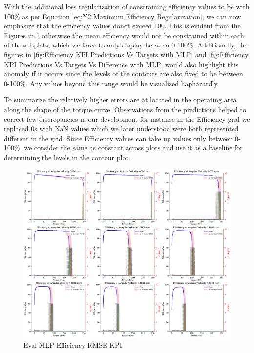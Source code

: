 \documentclass{report} %
\begin{document}
With the additional loss regularization of constraining efficiency values to be with 100\% as per Equation \ref{eq:Y2 Maximum Efficiency Regularization}, we can now emphasize 
that the efficiency values donot exceed 100. This is evident from the Figures in \ref{fig:Eval MLP Efficiency RMSE KPI} otherwise the mean efficiency would not be constrained 
within each of the subplots, which we force to only display between 0-100\%. Additionally, the figures in \ref{fig:Efficiency KPI Predictions Vs Targets with MLP} and 
\ref{fig:Efficiency KPI Predictions Vs Targets Vs Difference with MLP} would also highlight this anomaly if it occurs since the levels of the contours are also fixed to 
be between 0-100\%. Any values beyond this range would be visualized haphazardly.

To summarize the relatively higher errors are at located in the operating area along the shape of the torque curve.
Observations from the predictions helped to correct few discrepancies in our development for instance in the Efficiency grid we replaced 0s with \ac{NaN} values which 
we later understood were both represented different in the grid. Since Efficiency values can take up values only between 0-100\%, we consider the same as constant 
across plots and use it as a baseline for determining the levels in the contour plot.

\begin{figure}[H]
    \centering
    \includegraphics[width=1\textwidth]{./ReportImages/rmse_eta_MLP.png} 
    \caption{Eval MLP Efficiency \ac{RMSE} \ac{KPI}} 
    \label{fig:Eval MLP Efficiency RMSE KPI}
\end{figure}
\end{document}
